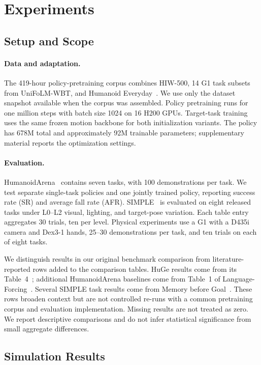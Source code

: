 \section{Experiments}
\label{sec:experiments}
\subsection{Setup and Scope}
\paragraph{Data and adaptation.}
The 419-hour policy-pretraining corpus combines HIW-500, 14 G1 task subsets from UniFoLM-WBT, and Humanoid Everyday~\cite{humanoid_everyday}. We use only the dataset snapshot available when the corpus was assembled. Policy pretraining runs for one million steps with batch size 1024 on 16 H200 GPUs. Target-task training uses the same frozen motion backbone for both initialization variants. The policy has 678M total and approximately 92M trainable parameters; supplementary material reports the optimization settings.

\paragraph{Evaluation.}
HumanoidArena~\cite{humanoidarena} contains seven tasks, with 100 demonstrations per task. We test separate single-task policies and one jointly trained policy, reporting success rate (SR) and average fall rate (AFR). SIMPLE~\cite{simple} is evaluated on eight released tasks under L0--L2 visual, lighting, and target-pose variation. Each table entry aggregates 30 trials, ten per level. Physical experiments use a G1 with a D435i camera and Dex3-1 hands, 25--30 demonstrations per task, and ten trials on each of eight tasks.

We distinguish results in our original benchmark comparison from literature-reported rows added to the comparison tables. HuGe results come from its Table~4~\cite{liu2026huge}; additional HumanoidArena baselines come from Table~1 of Language-Forcing~\cite{li2026languageforcing}. Several SIMPLE task results come from Memory before Goal~\cite{chen2026memorybeforegoal}. These rows broaden context but are not controlled re-runs with a common pretraining corpus and evaluation implementation. Missing results are not treated as zero. We report descriptive comparisons and do not infer statistical significance from small aggregate differences.

\subsection{Simulation Results}
